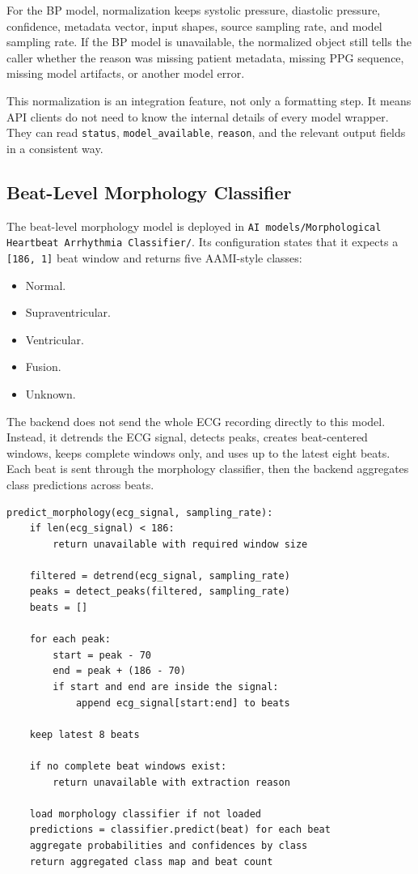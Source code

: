 For the BP model, normalization keeps systolic pressure, diastolic pressure, confidence, metadata vector, input shapes, source sampling rate, and model sampling rate. If the BP model is unavailable, the normalized object still tells the caller whether the reason was missing patient metadata, missing PPG sequence, missing model artifacts, or another model error.

This normalization is an integration feature, not only a formatting step. It means API clients do not need to know the internal details of every model wrapper. They can read \texttt{status}, \texttt{model\_available}, \texttt{reason}, and the relevant output fields in a consistent way.

\subsection{Beat-Level Morphology Classifier}

The beat-level morphology model is deployed in \texttt{AI models/Morphological Heartbeat Arrhythmia Classifier/}. Its configuration states that it expects a \texttt{[186, 1]} beat window and returns five AAMI-style classes:

\begin{itemize}
    \item Normal.
    \item Supraventricular.
    \item Ventricular.
    \item Fusion.
    \item Unknown.
\end{itemize}

The backend does not send the whole ECG recording directly to this model. Instead, it detrends the ECG signal, detects peaks, creates beat-centered windows, keeps complete windows only, and uses up to the latest eight beats. Each beat is sent through the morphology classifier, then the backend aggregates class predictions across beats.

\begin{lstlisting}[caption={Pseudocode for beat-level morphology inference}]
predict_morphology(ecg_signal, sampling_rate):
    if len(ecg_signal) < 186:
        return unavailable with required window size

    filtered = detrend(ecg_signal, sampling_rate)
    peaks = detect_peaks(filtered, sampling_rate)
    beats = []

    for each peak:
        start = peak - 70
        end = peak + (186 - 70)
        if start and end are inside the signal:
            append ecg_signal[start:end] to beats

    keep latest 8 beats

    if no complete beat windows exist:
        return unavailable with extraction reason

    load morphology classifier if not loaded
    predictions = classifier.predict(beat) for each beat
    aggregate probabilities and confidences by class
    return aggregated class map and beat count
\end{lstlisting}

